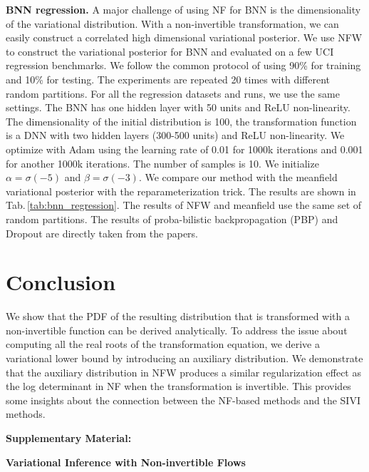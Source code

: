 \documentclass{article}
\newcommand{\acr}[1]{\textsc{#1}\xspace}
\newcommand{\us}{\acr{NFW}}
\begin{document}
\textbf{BNN regression.} A major challenge of using NF for BNN is the dimensionality of the variational distribution. With a non-invertible transformation, we can easily construct a correlated high dimensional variational posterior. We use \us to construct the variational posterior for BNN and evaluated on a few UCI regression benchmarks. We follow the common protocol of using 90\% for training and 10\% for testing. The experiments are repeated 20 times with different random partitions. For all the regression datasets and runs, we use the same settings. The BNN has one hidden layer with 50 units and ReLU non-linearity. The dimensionality of the initial distribution is 100, the transformation function is a DNN with two hidden layers (300-500 units) and ReLU non-linearity. We optimize with Adam using the learning rate of 0.01 for 1000k iterations and 0.001 for another 1000k iterations. The number of samples is 10. We initialize $\alpha=\sigma(-5)$ and $\beta=\sigma(-3)$. We compare our method with the meanfield variational posterior with the reparameterization trick. The results are shown in Tab.\,\ref{tab:bnn_regression}. The results of \us and meanfield use the same set of random partitions. The results of proba-bilistic backpropagation (PBP) \citep{hernandezAdams2015} and Dropout \citep{GalGhahramani2016} are directly taken from the papers.

\section{Conclusion}

We show that the PDF of the resulting distribution that is transformed with a non-invertible function can be derived analytically. To address the issue about computing all the real roots of the transformation equation, we derive a variational lower bound by introducing an auxiliary distribution. We demonstrate that the auxiliary distribution in \us produces a similar regularization effect as the log determinant in NF when the transformation is invertible. This provides some insights about the connection between the NF-based methods and the SIVI methods.

{


}

\newpage
\setcounter{page}{1}

    \begin{center}{\textbf{\LARGE Supplementary Material:}}
    \end{center}

    \begin{center}{\textbf{\Large Variational Inference with Non-invertible Flows}}
    \end{center}
    \vspace{0.3in}
\end{document}
